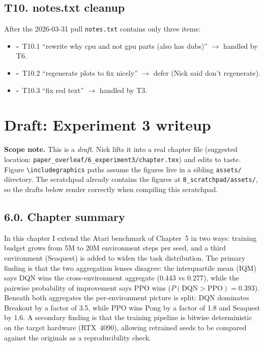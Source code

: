 \documentclass[11pt,a4paper]{article}
\newcommand{\todoitem}{$\square$~}
\newcommand{\fileline}[1]{\texttt{\small #1}}
\begin{document}
\subsection*{T10. notes.txt cleanup}

After the 2026-03-31 pull \fileline{notes.txt} contains only three
items:
\begin{itemize}[leftmargin=*,itemsep=2pt]
  \item \todoitem T10.1 ``rewrite why cpu and not gpu parts (also has
  dubs)'' $\to$ handled by T6.
  \item \todoitem T10.2 ``regenerate plots to fix nicely'' $\to$ defer
  (Nick said don't regenerate).
  \item \todoitem T10.3 ``fix red text'' $\to$ handled by T3.
\end{itemize}

\section{Draft: Experiment 3 writeup}\label{sec:exp3draft}

\textbf{Scope note.} This is a \emph{draft}. Nick lifts it into a real
chapter file (suggested location:
\fileline{paper\_overleaf/6\_experiment3/chapter.tex}) and edits to taste.
Figure \fileline{\textbackslash includegraphics} paths assume the figures
live in a sibling \fileline{assets/} directory. The scratchpad already
contains the figures at \fileline{8\_scratchpad/assets/}, so the drafts
below render correctly when compiling this scratchpad.

\subsection*{6.0. Chapter summary}

In this chapter I extend the Atari benchmark of Chapter~5 in two ways:
training budget grows from 5M to 20M environment steps per seed, and a
third environment (Seaquest) is added to widen the task distribution.
The primary finding is that the two aggregation lenses disagree: the
interquartile mean (IQM) says DQN wins the cross-environment aggregate
(0.443 vs 0.277), while the pairwise probability of improvement says PPO
wins ($P(\text{DQN}>\text{PPO})=0.393$). Beneath both aggregates the
per-environment picture is split: DQN dominates Breakout by a factor of
3.5, while PPO wins Pong by a factor of 1.8 and Seaquest by 1.6. A
secondary finding is that the training pipeline is bitwise deterministic
on the target hardware (RTX~4090), allowing retrained seeds to be
compared against the originals as a reproducibility check.
\end{document}
